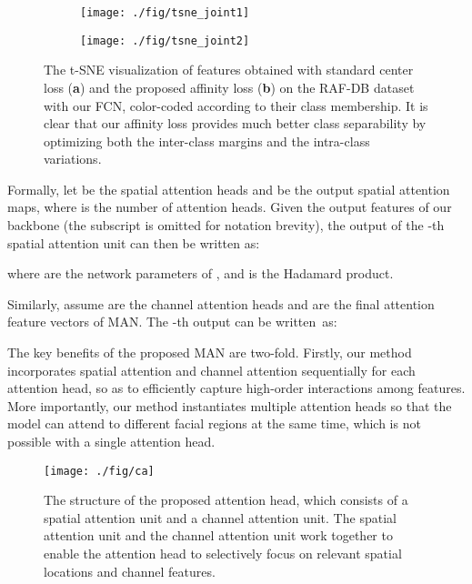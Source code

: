 \documentclass{article}
\begin{document}
\begin{figure}[]
  \centering
  \begin{subfigure}[b]{0.48\textwidth}
\texttt{[image: ./fig/tsne\_joint1]}
    \captionsetup{justification=centering}
    \caption{}
    \vspace{2mm}
  \end{subfigure} 
\begin{subfigure}[b]{0.48\textwidth}
\texttt{[image: ./fig/tsne\_joint2]}
    \captionsetup{justification=centering}
    \caption{}
    \vspace{2mm}
  \end{subfigure}
  \caption{The t-SNE visualization of features obtained with standard center loss (\textbf{a}) and the proposed affinity loss (\textbf{b}) on the RAF-DB dataset with our FCN, color-coded according to their class membership. It is clear that our affinity loss provides much better class separability by optimizing both the inter-class margins and the intra-class variations.}
  \label{fig:tsne}
\end{figure}



Formally, let  be the spatial attention heads and  be the output spatial attention maps, where  is the number of attention heads. {Given the output features of our backbone  (the subscript  is omitted for notation brevity), the output of the -th spatial attention unit can then be written as:}

\noindent where  are the network parameters of , {and  is the Hadamard product.}

Similarly, {assume  are the channel attention heads and \linebreak  are the final attention feature vectors of MAN. The -th output  can be written~as:}


The key benefits of the proposed MAN are two-fold. Firstly, our method incorporates spatial attention and channel attention sequentially for each attention head, so as to efficiently capture high-order interactions among features. More importantly, our method instantiates multiple attention heads so that the model can attend to different facial regions at the same time, which is not possible with a single attention head.


\begin{figure}[]
\centering
{\texttt{[image: ./fig/ca]}}
\caption{The structure of the proposed attention head, which consists of a spatial attention unit and a channel attention unit. The spatial attention unit and the channel attention unit work together to enable the attention head to selectively focus on relevant spatial locations and channel features.}
\label{fig:ca}

\end{figure}
\end{document}
